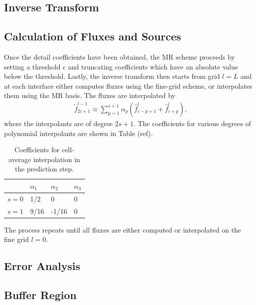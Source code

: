 \documentclass{article}
\begin{document}
    \subsection{Inverse Transform}

        
    \subsection{Calculation of Fluxes and Sources}
        Once the detail coefficients have been obtained, the MR scheme
        proceeds by setting a threshold $\epsilon$ and truncating coefficients
        which have an absolute value below the threshold. Lastly, the inverse
        transform then starts from grid $l=L$ and at each interface either
        computes fluxes using the fine-grid scheme, or interpolates them using
        the MR basis. The fluxes are interpolated by
        \begin{align}
            & \tilde{f}_{2i+1}^{l-1} \approx \sum_{p=1}^{s+1} \alpha_{p} \left(
            \hat{f}^{l}_{i-p+1} + \hat{f}^{l}_{i+p} \right),
        \end{align}
        where the interpolants are of degree $2s+1$. The coefficients for
        various degrees of polynomial interpolants are shown in Table (ref).
        \begin{table}
            \centering
            \begin{tabular}{|l|l|l|l|}
            \hline
                & $\alpha_{1}$ & $\alpha_{2}$ & $\alpha_{3}$ \\ \hline
                $s=0$ & 1/2 & 0 & 0 \\ \hline
                $s=1$ & 9/16 & -1/16 & 0 \\ \hline
            \end{tabular}
            \caption{Coefficients for cell-average interpolation in the prediction step.}
        \end{table}
        The process repeats until all fluxes are either computed or
        interpolated on the fine grid $l=0$.

        \subsection{Error Analysis}


        \subsection{Buffer Region}
\end{document}
